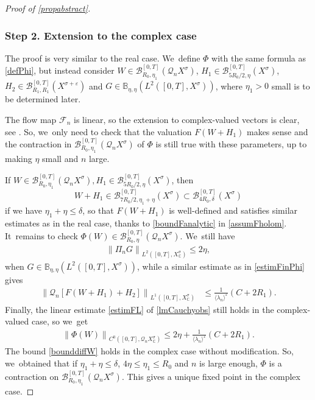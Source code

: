 \documentclass[11pt]{article}
\theoremstyle{definition}
\let\mc\mathcal
\let\veps\varepsilon
\newcommand{\B}{\mc{B}}
\newcommand{\Q}{\mathcal{Q}}
\providecommand{\inn}[1]{\langle#1\rangle}
\newcommand\nor[2]{\left\|#1\right\|_{#2}}
\newcommand\FL{\mathcal{F}_{n}}
\begin{document}
\begin{proof}[Proof of \cref{propabstract}]
\subsubsection*{Step 2. Extension to the complex case} The proof is very similar to the real case. We~define $\Phi$ with the same formula as \eqref{defPhi}, but instead consider $W\in \B_{R_{0},\eta_{1}}^{[0,T]}(\Q_n X^{\sigma})$, $H_{1}\in \B_{5R_{0}/2,\eta}^{[0,T]}(X^{\sigma})$, $H_{2}\in \B_{R_{1}, R_{1}}^{[0,T]}(X^{\sigma+\veps})$ and $G\in \mathbb{B}_{\eta,\eta}(L^{2}([0,T],X^{\sigma}))$, where $\eta_{1}>0$ small is to be determined later.

The flow map $\FL$ is linear, so the extension to complex-valued vectors is clear, see \cite[Th.\,3]{BS:71-polynomials}. So, we~only need to check that the valuation $F(W+H_{1})$ makes sense and the contraction in $\B_{R_{0},\eta_{1}}^{[0,T]}(\Q_n X^{\sigma})$ of $\Phi$ is still true with these parameters, up to making $\eta$ small and $n$ large.

If $W\in \B_{R_{0},\eta_{1}}^{[0,T]}(\Q_n X^{\sigma}), H_{1}\in \B_{5R_{0}/2,\eta}^{[0,T]}(X^{\sigma})$, then
\[
W+H_{1}\in \B_{7R_{0}/2,\eta_{1}+\eta}^{[0,T]}(X^{\sigma})\subset \B_{4R_{0},\delta}^{[0,T]}(X^{\sigma})
\]
if we have $\eta_{1}+\eta\leq \delta$, so that $F(W+H_{1})$ is well-defined and satisfies similar estimates as in the real case, thanks to \eqref{boundFanalytic} in \cref{assumFholom}. It~remains to check $\Phi(W)\in \B_{R_{0},\eta}^{[0,T]}(\Q_n X^{\sigma})$. We~still have
\begin{align*}
\nor{\Pi_{n}G}{L^{2}([0,T],X_\mathbb{C}^{\sigma})}\leq 2\eta,
\end{align*}
when $G\in \mathbb{B}_{\eta,\eta}(L^{2}([0,T],X^{\sigma}))$, while a similar estimate as in \eqref{estimFinPhi} gives
\begin{align*}
\nor{\Q_{n}\left[ F(W+H_{1})+H_{2}\right]}{L^{1}([0,T],X_\mathbb{C}^{\sigma})}&\leq \frac{1}{\inn{\lambda_n}^{\veps}} \left(C+2R_{1}\right).
\end{align*}
Finally, the linear estimate \eqref{estimFL} of \cref{lmCauchyobs} still holds in the complex-valued case, so we~get
\begin{align*}
\nor{\Phi(W)}{C^{0}([0,T],\Q_{n}X_\mathbb{C}^{\sigma})}\leq 2\eta+ \frac{1}{\inn{\lambda_n}^{\veps}} \left(C+2R_{1}\right).
\end{align*}
The bound \eqref{bounddiffW} holds in the complex case without modification. So, we~obtained that if $\eta_{1}+\eta\leq \delta$, $4\eta\leq \eta_{1}\leq R_{0}$ and $n$ is large enough, $\Phi$ is a contraction on $\B_{R_{0},\eta_{1}}^{[0,T]}(\Q_n X^{\sigma})$. This gives a unique fixed point in the complex case.


\end{proof}
\end{document}
